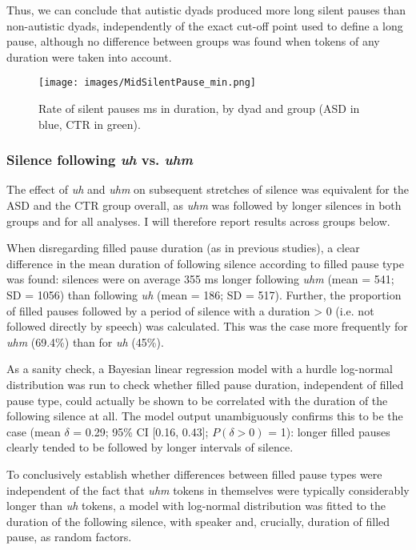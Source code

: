  Thus, we can conclude that autistic dyads produced more long silent pauses than non-autistic dyads, independently of the exact cut-off point used to define a long pause, although no difference between groups was found when tokens of any duration were taken into account.

 
\begin{figure}

\texttt{[image: images/MidSilentPause\_min.png]} \hfill{}

\caption{Rate of silent pauses  ms in duration, by dyad and group (ASD in blue, CTR in green).}\label{fig:silent700ms}
\end{figure}

\subsubsection{\texorpdfstring{Silence following \emph{uh} vs. \emph{uhm}}{uh vs. uhm}}\label{BCFP_FP_silent_results_uhm}

The effect of \emph{uh} and \emph{uhm} on subsequent stretches of silence was equivalent for the ASD and the CTR group overall, as \emph{uhm} was followed by longer silences in both groups and for all analyses. I will therefore report results across groups below. 

When disregarding filled pause duration (as in previous studies), a clear difference in the mean duration of following silence according to filled pause type was found: silences were on average 355 ms longer following \emph{uhm} (mean = 541; SD = 1056) than following \emph{uh} (mean = 186; SD = 517). Further, the proportion of filled pauses followed by a period of silence with a duration > 0 (i.e. not followed directly by speech) was calculated. This was the case more frequently for \emph{uhm} (69.4\%) than for \emph{uh} (45\%). 

As a sanity check, a Bayesian linear regression model with a hurdle log-normal distribution was run to check whether filled pause duration, independent of filled pause type, could actually be shown to be correlated with the duration of the following silence at all. The model output unambiguously confirms this to be the case (mean \(\delta\) = 0.29; 95\% CI {[}0.16, 0.43{]}; \(P(\delta > 0)\) = 1): longer filled pauses clearly tended to be followed by longer intervals of silence.

To conclusively establish whether differences between filled pause types were independent of the fact that \emph{uhm} tokens in themselves were typically considerably longer than \emph{uh} tokens, a model with log-normal distribution was fitted to the duration of the following silence, with speaker and, crucially, duration of filled pause, as random factors.

